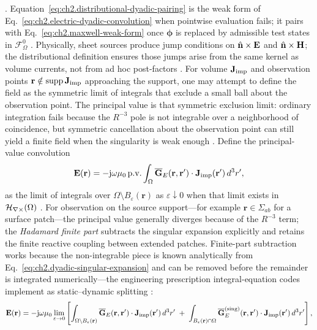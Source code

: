 \cite{stratton1941}. Equation~\eqref{eq:ch2.distributional-dyadic-pairing} is the
weak form of Eq.~\eqref{eq:ch2.electric-dyadic-convolution} when pointwise evaluation
fails; it pairs with Eq.~\eqref{eq:ch2.maxwell-weak-form} once \(\boldsymbol{\phi}\)
is replaced by admissible test states in \(\mathcal{F}_\Omega^{0}\)
\cite{harrington2001}. Physically, sheet sources produce jump conditions on
\(\hat{\mathbf{n}}\times\mathbf{E}\) and \(\hat{\mathbf{n}}\times\mathbf{H}\); the distributional
definition ensures those jumps arise from the same kernel as volume currents, not from
ad hoc post-factors \cite{stratton1941}.
For volume \(\mathbf{J}_{\mathrm{imp}}\) and observation points \(\mathbf{r}\notin\operatorname{supp}\mathbf{J}_{\mathrm{imp}}\)
approaching the support, one may attempt to define the field as the symmetric limit of
integrals that exclude a small ball about the observation point. The principal value is that
symmetric exclusion limit: ordinary integration fails because the $R^{-3}$ pole is not
integrable over a neighborhood of coincidence, but symmetric cancellation about the
observation point can still yield a finite field when the singularity is weak enough
\cite{jackson1999}. Define the principal-value convolution
\begin{equation}
\label{eq:ch2.principal-value-convolution}
\mathbf{E}(\mathbf{r})
=
-\mathrm{j}\omega\mu_0\,\mathrm{p.v.}\int_{\Omega}
\overline{\mathbf{G}}_{E}(\mathbf{r},\mathbf{r}')\cdot\mathbf{J}_{\mathrm{imp}}(\mathbf{r}')\,d^{3}r',
\end{equation}
as the limit of integrals over \(\Omega\setminus B_{\varepsilon}(\mathbf{r})\) as
\(\varepsilon\downarrow 0\) when that limit exists in \(\mathcal{H}_{\nabla\times}(\Omega)\)
\cite{jackson1999}. For observation on the source support---for example
\(\mathbf{r}\in\Sigma_{ab}\) for a surface patch---the principal value generally
diverges because of the \(R^{-3}\) term; the \emph{Hadamard finite part} subtracts
the singular expansion explicitly and retains the finite reactive coupling between
extended patches. Finite-part subtraction works because the non-integrable piece is known
analytically from Eq.~\eqref{eq:ch2.dyadic-singular-expansion} and can be removed before
the remainder is integrated numerically---the engineering prescription integral-equation codes implement
as static--dynamic splitting \cite{harrington2001}:
\begin{equation}
\label{eq:ch2.finite-part-convolution}
\mathbf{E}(\mathbf{r})
=
-\mathrm{j}\omega\mu_0\lim_{\varepsilon\to 0}
\left[
\int_{\Omega\setminus B_{\varepsilon}(\mathbf{r})}
\overline{\mathbf{G}}_{E}(\mathbf{r},\mathbf{r}')\cdot\mathbf{J}_{\mathrm{imp}}(\mathbf{r}')\,d^{3}r'
\;+\;
\int_{B_{\varepsilon}(\mathbf{r})\cap\Omega}
\overline{\mathbf{G}}_{E}^{\mathrm{(sing)}}(\mathbf{r},\mathbf{r}')\cdot\mathbf{J}_{\mathrm{imp}}(\mathbf{r}')\,d^{3}r'
\right],
\end{equation}
